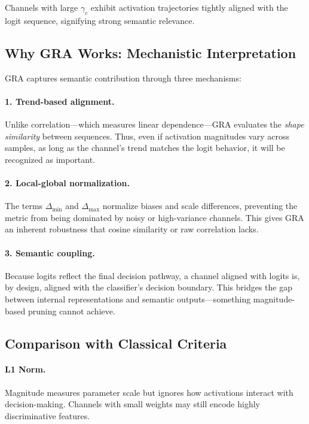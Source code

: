 \documentclass[sn-mathphys,Numbered]{sn-jnl}
\begin{document}
Channels with large $\gamma_{c}$ exhibit activation trajectories tightly aligned with the logit sequence, signifying strong semantic relevance.

\subsection{Why GRA Works: Mechanistic Interpretation}

GRA captures semantic contribution through three mechanisms:

\paragraph{1. Trend-based alignment.}  
Unlike correlation—which measures linear dependence—GRA evaluates the \emph{shape similarity} between sequences. Thus, even if activation magnitudes vary across samples, as long as the channel’s trend matches the logit behavior, it will be recognized as important.

\paragraph{2. Local-global normalization.}  
The terms $\Delta_{\min}$ and $\Delta_{\max}$ normalize biases and scale differences, preventing the metric from being dominated by noisy or high-variance channels. This gives GRA an inherent robustness that cosine similarity or raw correlation lacks.

\paragraph{3. Semantic coupling.}  
Because logits reflect the final decision pathway, a channel aligned with logits is, by design, aligned with the classifier’s decision boundary. This bridges the gap between internal representations and semantic outputs—something magnitude-based pruning cannot achieve.

\subsection{Comparison with Classical Criteria}

\paragraph{L1 Norm.}  
Magnitude measures parameter scale but ignores how activations interact with decision-making. Channels with small weights may still encode highly discriminative features.
\end{document}
